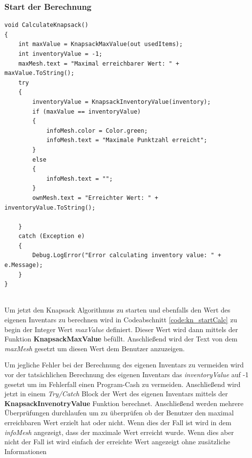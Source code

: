\subsubsection{Start der Berechnung}
\begin{lstlisting}[style=csharp, caption={Start der Berechnung}, label=code:kn_startCalc]
void CalculateKnapsack()
{
    int maxValue = KnapsackMaxValue(out usedItems);
    int inventoryValue = -1;
    maxMesh.text = "Maximal erreichbarer Wert: " + maxValue.ToString();
    try
    {
        inventoryValue = KnapsackInventoryValue(inventory);
        if (maxValue == inventoryValue)
        {
            infoMesh.color = Color.green;
            infoMesh.text = "Maximale Punktzahl erreicht";
        }
        else
        {
            infoMesh.text = "";
        }
        ownMesh.text = "Erreichter Wert: " + inventoryValue.ToString();

    }
    catch (Exception e)
    {
        Debug.LogError("Error calculating inventory value: " + e.Message);
    }
}
\end{lstlisting}\\
Um jetzt den Knapsack Algorithmus zu starten und ebenfalls den Wert des eigenen Inventars zu berechnen wird in Codeabschnitt
\ref{code:kn_startCalc} zu begin der Integer Wert \textit{maxValue} definiert. Dieser Wert wird dann mittels der Funktion
\textbf{KnapsackMaxValue} befüllt. Anschließend wird der Text von dem \textit{maxMesh} gesetzt um diesen Wert dem Benutzer
anzuzeigen.

Um jegliche Fehler bei der Berechnung des eigenen Inventars zu vermeiden wird vor der tatsächlichen Berechnung des eigenen
Inventars das \textit{inventoryValue} auf -1 gesetzt um im Fehlerfall einen Program-Cash zu vermeiden.
Anschließend wird jetzt in einem \textit{Try/Catch} Block der Wert des eigenen Inventars mittels der \textbf{KnapsackInvenotryValue}
Funktion berechnet. Anschließend werden mehrere Überprüfungen durchlaufen um zu überprüfen ob der Benutzer den maximal erreichbaren
Wert erzielt hat oder nicht. Wenn dies der Fall ist wird in dem \textit{infoMesh} angezeigt, dass der maximale Wert erreicht wurde.
Wenn dies aber nicht der Fall ist wird einfach der erreichte Wert angezeigt ohne zusätzliche Informationen\\

